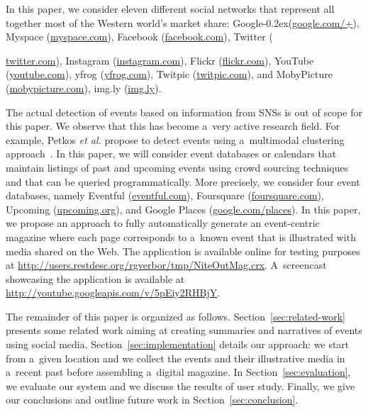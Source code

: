 \documentclass[runningheads,a4paper]{llncs}
\newcommand{\googleplus}{Google\nolinebreak\hspace{0em}\raisebox{.28ex}{\tiny\bf +}\kern-0.2ex\xspace}
\begin{document}
In this paper, we consider eleven different social networks that represent all together most of the Western world's market share: \googleplus (\url{google.com/+}),
Myspace (\url{myspace.com}),
Facebook (\url{facebook.com}),
Twitter ({\url{twitter.com}),
Instagram (\url{instagram.com}),
Flickr (\url{flickr.com}),
YouTube (\url{youtube.com}),
yfrog (\url{yfrog.com}),
Twitpic (\url{twitpic.com}), and
MobyPicture (\url{mobypicture.com}),
\mbox{img.ly} (\url{img.ly}).

The actual detection of events based on information from SNSs is out of scope for this paper. We observe that this has become a~very active research field. For example, Petkos \emph{et al.} propose to detect events using a~multimodal clustering approach~\cite{Petkos2012}. In this paper, we will consider event databases or calendars that maintain listings of past and upcoming events using crowd sourcing techniques and that can be queried programmatically. More precisely, we consider four event databases, namely Eventful (\url{eventful.com}), Foursquare (\url{foursquare.com}), Upcoming (\url{upcoming.org}), and Google Places (\url{google.com/places}). In this paper, we propose an approach to fully automatically generate an event-centric magazine where each page corresponds to a~known event that is illustrated with media shared on the Web. The application is available online for testing purposes at \url{http://users.restdesc.org/rgverbor/tmp/NiteOutMag.crx}. A~screencast showcasing the application is available at \url{http://youtube.googleapis.com/v/5pEiy2RHBjY}.

The remainder of this paper is organized as follows. Section~\ref{sec:related-work} presents some related work aiming at creating summaries and narratives of events using social media. Section~\ref{sec:implementation} details our approach: we start from a~given location and we collect the events and their illustrative media in a~recent past before assembling a~digital magazine. In Section~\ref{sec:evaluation}, we evaluate our system and we discuss the results of user study. Finally, we give our conclusions and outline future work in Section~\ref{sec:conclusion}.


}
\end{document}
